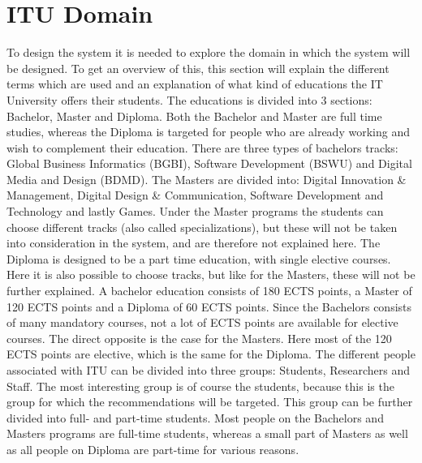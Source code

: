 \newpage
\section{ITU Domain}
To design the system it is needed to explore the domain in which the system will be designed. To get an overview of this, this section will explain the different terms which are used and an explanation of what kind of educations the IT University offers their students.\newline
The educations is divided into 3 sections: Bachelor, Master and Diploma. Both the Bachelor and Master are full time studies, whereas the Diploma is targeted for people who are already working and wish to complement their education. There are three types of bachelors tracks: Global Business Informatics (BGBI), Software Development (BSWU) and Digital Media and Design (BDMD). The Masters are divided into: Digital Innovation \& Management, Digital Design \& Communication, Software Development and Technology and lastly Games. Under the Master programs the students can choose different tracks (also called specializations), but these will not be taken into consideration in the system, and are therefore not explained here. The Diploma is designed to be a part time education, with single elective courses. Here it is also possible to choose tracks, but like for the Masters, these will not be further explained. 
A bachelor education consists of 180 ECTS points, a Master of 120 ECTS points and a Diploma of 60 ECTS points. Since the Bachelors consists of many mandatory courses, not a lot of ECTS points are available for elective courses. The direct opposite is the case for the Masters. Here most of the 120 ECTS points are elective, which is the same for the Diploma. \newline
The different people associated with ITU can be divided into three groups: Students, Researchers and Staff. The most interesting group is of course the students, because this is the group for which the recommendations will be targeted. This group can be further divided into full- and part-time students. Most people on the Bachelors and Masters programs are full-time students, whereas a small part of Masters as well as all people on Diploma are part-time for various reasons. 
\newpage